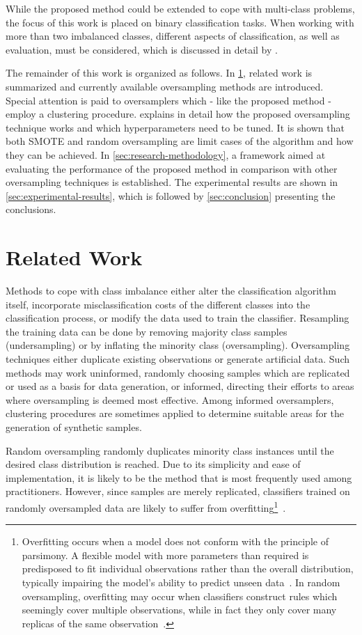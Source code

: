 \documentclass[sort&compress]{elsarticle}
\begin{document}
While the proposed method could be extended to cope with multi-class problems,
the focus of this work is placed on binary classification tasks. When working
with more than two imbalanced classes, different aspects of classification, as
well as evaluation, must be considered, which is discussed in detail by
\citet{Fernandez.2013}.

The remainder of this work is organized as follows. In \cref{sec:related-work},
related work is summarized and currently available oversampling methods are
introduced. Special attention is paid to oversamplers which - like the proposed
method - employ a clustering procedure.  explains in
detail how the proposed oversampling technique works and which hyperparameters
need to be tuned. It is shown that both \ac{SMOTE} and random oversampling are
limit cases of the algorithm and how they can be achieved. In
\cref{sec:research-methodology}, a framework aimed at evaluating the performance
of the proposed method in comparison with other oversampling techniques is
established. The experimental results are shown in
\cref{sec:experimental-results}, which is followed by \cref{sec:conclusion}
presenting the conclusions.

\section{Related Work}
\label{sec:related-work}

Methods to cope with class imbalance either alter the classification algorithm
itself, incorporate misclassification costs of the different classes into the
classification process, or modify the data used to train the classifier.
Resampling the training data can be done by removing majority class samples
(undersampling) or by inflating the minority class (oversampling). Oversampling
techniques either duplicate existing observations or generate artificial data.
Such methods may work uninformed, randomly choosing samples which are replicated
or used as a basis for data generation, or informed, directing their efforts to
areas where oversampling is deemed most effective. Among informed oversamplers,
clustering procedures are sometimes applied to determine suitable areas for the
generation of synthetic samples.

Random oversampling randomly duplicates minority class instances until the
desired class distribution is reached. Due to its simplicity and ease of
implementation, it is likely to be the method that is most frequently used among
practitioners. However, since samples are merely replicated, classifiers trained
on randomly oversampled data are likely to suffer from
overfitting\footnote{Overfitting occurs when a model does not conform with the
principle of parsimony. A flexible model with more parameters than required is
predisposed to fit individual observations rather than the overall distribution,
typically impairing the model's ability to predict unseen
data~\citep{Hawkins.2004}. In random oversampling, overfitting may occur when
classifiers construct rules which seemingly cover multiple observations, while
in fact they only cover many replicas of the same
observation~\citep{Batista.2004}.}~\citep{Batista.2004,Chawla.2004}.
\end{document}
